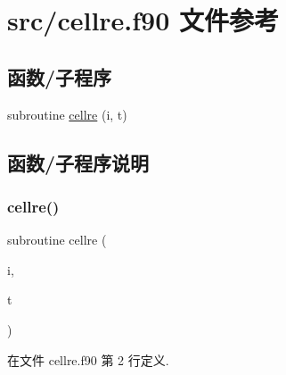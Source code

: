 \hypertarget{cellre_8f90}{}\section{src/cellre.f90 文件参考}
\label{cellre_8f90}
\subsection*{函数/子程序}
\begin{DoxyCompactItemize}
\item 
subroutine \mbox{\hyperlink{cellre_8f90_ac2b1b812cd9e114b826ecf72131a6428}{cellre}} (i, t)
\end{DoxyCompactItemize}


\subsection{函数/子程序说明}
\mbox{\label{cellre_8f90_ac2b1b812cd9e114b826ecf72131a6428}} 
\subsubsection{\texorpdfstring{cellre()}{cellre()}}
{\footnotesize\ttfamily subroutine cellre (\begin{DoxyParamCaption}\item[{}]{i,  }\item[{}]{t }\end{DoxyParamCaption})}



在文件 cellre.\+f90 第 2 行定义.

